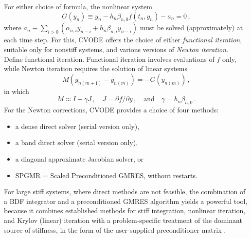 For either choice of formula, the nonlinear system
\begin{equation}\label{NLS}
  G(y_n) \equiv y_n - h_n \beta_{n,0} f(t_n,y_n) - a_n = 0 \, ,
\end{equation}
where $a_n \equiv \sum_{i>0}(\alpha_{n,i} y_{n-i} + h_n \beta_{n,i} \dot{y}_{n-i})$ 
must be solved (approximately) at each time step.  For this, CVODE
offers the choice of either {\em functional iteration}, suitable only
for nonstiff systems, and various versions of {\em Newton iteration}.
{\sf Define functional iteration.}
Functional iteration involves evaluations of $f$ only, while Newton
iteration requires the solution of linear systems
\begin{equation}\label{Newtoncorr}
  M (y_{n(m+1)} - y_{n(m)}) = -G(y_{n(m)}) \, ,
\end{equation}
in which
\begin{equation}\label{Newtonmat} 
  M \approx I - \gamma J \, , 
  \quad J = \partial f / \partial y \, ,
  \quad \mbox{and} \quad 
  \gamma = h_n \beta_{n,0} \, . 
\end{equation}
For the Newton corrections, CVODE provides a choice of four methods:
\begin{itemize}
\item a dense direct solver (serial version only),
\item a band direct solver (serial version only),
\item a diagonal approximate Jacobian solver, or
\item SPGMR = Scaled Preconditioned GMRES, without restarts.
\end{itemize}
For large stiff systems, where direct methods are not feasible, the
combination of a BDF integrator and a preconditioned GMRES algorithm
yields a powerful tool, because it combines established methods for
stiff integration, nonlinear iteration, and Krylov (linear) iteration
with a problem-specific treatment of the dominant source of stiffness,
in the form of the user-supplied preconditioner matrix \cite{BrHi:89}.

